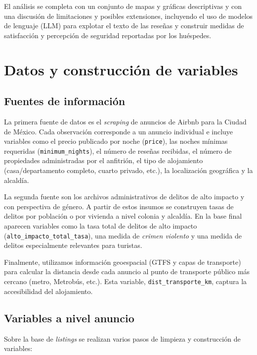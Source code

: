 \documentclass[12pt]{article}
\begin{document}
El análisis se completa con un conjunto de mapas y gráficas descriptivas y con una discusión de limitaciones y posibles extensiones, incluyendo el uso de modelos de lenguaje (LLM) para explotar el texto de las reseñas y construir medidas de satisfacción y percepción de seguridad reportadas por los huéspedes.

\section{Datos y construcción de variables}

\subsection{Fuentes de información}

La primera fuente de datos es el \textit{scraping} de anuncios de Airbnb para la Ciudad de México. Cada observación corresponde a un anuncio individual e incluye variables como el precio publicado por noche (\texttt{price}), las noches mínimas requeridas (\texttt{minimum\_nights}), el número de reseñas recibidas, el número de propiedades administradas por el anfitrión, el tipo de alojamiento (casa/departamento completo, cuarto privado, etc.), la localización geográfica y la alcaldía.

La segunda fuente son los archivos administrativos de delitos de alto impacto y con perspectiva de género. A partir de estos insumos se construyen tasas de delitos por población o por vivienda a nivel colonia y alcaldía. En la base final aparecen variables como la tasa total de delitos de alto impacto (\texttt{alto\_impacto\_total\_tasa}), una medida de \emph{crimen violento} y una medida de delitos especialmente relevantes para turistas.

Finalmente, utilizamos información geoespacial (GTFS y capas de transporte) para calcular la distancia desde cada anuncio al punto de transporte público más cercano (metro, Metrobús, etc.). Esta variable, \texttt{dist\_transporte\_km}, captura la accesibilidad del alojamiento.

\subsection{Variables a nivel anuncio}

Sobre la base de \textit{listings} se realizan varios pasos de limpieza y construcción de variables:
\end{document}
